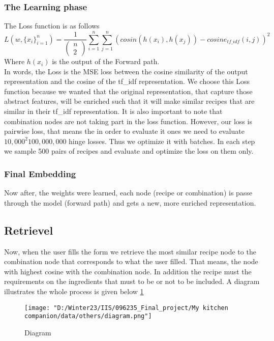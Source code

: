 \documentclass[]{article}
\begin{document}
\subsubsection{The Learning phase}
The Loss function is as follows 
$$L(w,\{x_i\}_{i=1}^{n}) = \frac{1}{\begin{pmatrix} n \\ 2 \end{pmatrix}}\sum_{i=1}^{n}\sum_{j=1}^{n}\left(cosin(h(x_i),h(x_j))-cosine_{tf\_idf}(i,j)\right)^2$$
Where $h(x_i)$ is the output of the Forward path.\\
In words, the Loss is the MSE loss between the cosine similarity of the output representation and the cosine of the tf\_idf representation. We choose this Loss function because we wanted that the original representation, that capture those abstract features, will be enriched such that it will make similar recipes that are similar in their tf\_idf representation. It is also important to note that combination nodes are not taking part in the loss function.
However, our loss is pairwise loss, that means the in order to evaluate it ones we need to evaluate $10,000^2 100,000,000$ hinge losses. Thus we optimize it with batches. In each step we sample 500 pairs of recipes and evaluate and optimize the loss on them only.

\subsubsection{Final Embedding}
Now after, the weights were learned, each node (recipe or combination) is passe through the model (forward path) and gets a new, more enriched representation.

\subsection{Retrievel}
Now, when the user fills the form we retrieve the most similar recipe node to the combination node that corresponds to what the user filled. That means, the node with highest cosine with the combination node. In addition the recipe must the requirements on the ingredients that must to be or not to be included.
A diagram illustrates the whole process is given below 
\ref{fig:diagram}
\begin{figure}[H]
	\centering
	\texttt{[image: "D:/Winter23/IIS/096235\_Final\_project/My kitchen companion/data/others/diagram.png"]}
	\caption[s]{Diagram}
	\label{fig:diagram}
\end{figure}
\end{document}
